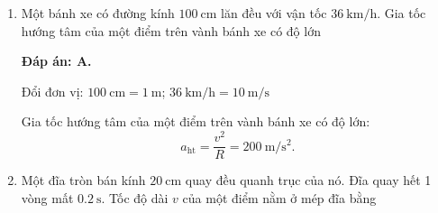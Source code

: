 \begin{enumerate}[label=\bfseries Câu \arabic*:, leftmargin=1.5cm]
	
	{
		Các công thức liên hệ giữa tốc độ góc $\omega$ với chu kỳ $T$ và giữa tốc độ góc $\omega$ với tần số $f$ trong chuyển động tròn đều là gì?
	}
	
	\hideall
	{	
		\textbf{Đáp án: B.}
		
		Công thức liên hệ giữa tốc độ góc $\omega$ với chu kỳ $T$ là $\omega=\dfrac{2\pi}{T}$.
		Công thức liên hệ giữa giữa tốc độ góc $\omega$ với tần số $f$ trong chuyển động tròn đều là $\omega=2\pi f$.
	}
	\item {}
	
	
	{
		Một bánh xe có đường kính $\SI{100}{\centi\meter}$ lăn đều với vận tốc $\SI{36}{\kilo\meter/\hour}$. Gia tốc hướng tâm của một điểm trên vành bánh xe có độ lớn
	}
	
	\hideall
	{	
		\textbf{Đáp án: A.}
		
		Đổi đơn vị: $\SI{100}{\centi\meter}=\SI{1}{\meter}$; $\SI{36}{\kilo\meter/\hour}=\SI{10}{\meter/\second}$
		
		Gia tốc hướng tâm của một điểm trên vành bánh xe có độ lớn:
		$$a_\text{ht}=\dfrac{v^2}{R}=\SI{200}{\meter/\second^2}.$$
	}
	\item {}
	
	
	{
		Một đĩa tròn bán kính $\SI{20}{\centi\meter}$ quay đều quanh trục của nó. Đĩa quay hết 1 vòng mất $\SI{0.2}{\second}$. Tốc độ dài $v$ của một điểm nằm ở mép đĩa bằng
	}
	

\end{enumerate}
